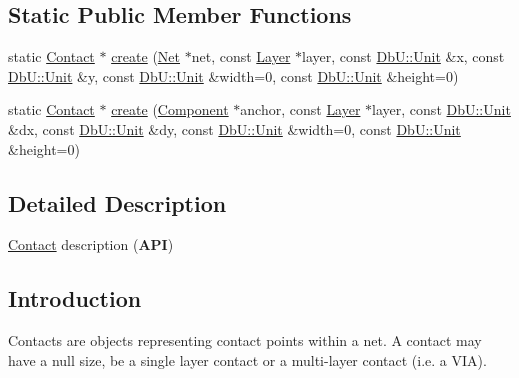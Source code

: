 \subsection*{Static Public Member Functions}
\begin{DoxyCompactItemize}
\item 
static \hyperlink{classHurricane_1_1Contact}{Contact} $\ast$ \hyperlink{classHurricane_1_1Contact_a5402fec0518c81d35fbec2c2b2ec0f8f}{create} (\hyperlink{classHurricane_1_1Net}{Net} $\ast$net, const \hyperlink{classHurricane_1_1Layer}{Layer} $\ast$layer, const \hyperlink{group__DbUGroup_ga4fbfa3e8c89347af76c9628ea06c4146}{Db\-U\-::\-Unit} \&x, const \hyperlink{group__DbUGroup_ga4fbfa3e8c89347af76c9628ea06c4146}{Db\-U\-::\-Unit} \&y, const \hyperlink{group__DbUGroup_ga4fbfa3e8c89347af76c9628ea06c4146}{Db\-U\-::\-Unit} \&width=0, const \hyperlink{group__DbUGroup_ga4fbfa3e8c89347af76c9628ea06c4146}{Db\-U\-::\-Unit} \&height=0)
\item 
static \hyperlink{classHurricane_1_1Contact}{Contact} $\ast$ \hyperlink{classHurricane_1_1Contact_a6645345f819cb4769fac075a0b1ea028}{create} (\hyperlink{classHurricane_1_1Component}{Component} $\ast$anchor, const \hyperlink{classHurricane_1_1Layer}{Layer} $\ast$layer, const \hyperlink{group__DbUGroup_ga4fbfa3e8c89347af76c9628ea06c4146}{Db\-U\-::\-Unit} \&dx, const \hyperlink{group__DbUGroup_ga4fbfa3e8c89347af76c9628ea06c4146}{Db\-U\-::\-Unit} \&dy, const \hyperlink{group__DbUGroup_ga4fbfa3e8c89347af76c9628ea06c4146}{Db\-U\-::\-Unit} \&width=0, const \hyperlink{group__DbUGroup_ga4fbfa3e8c89347af76c9628ea06c4146}{Db\-U\-::\-Unit} \&height=0)
\end{DoxyCompactItemize}


\subsection{Detailed Description}
\hyperlink{classHurricane_1_1Contact}{Contact} description ({\bfseries A\-P\-I}) 

\hypertarget{classHurricane_1_1Contact_secContactIntro}{}\subsection{Introduction}\label{classHurricane_1_1Contact_secContactIntro}
Contacts are objects representing contact points within a net. A contact may have a null size, be a single layer contact or a multi-\/layer contact (i.\-e. a V\-I\-A). 

